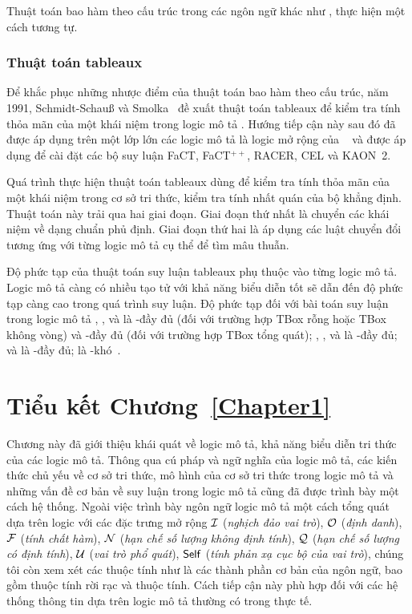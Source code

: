 Thuật toán bao hàm theo cấu trúc trong các ngôn ngữ khác như \FLbot, \ALN thực hiện một cách tương tự.

\subsubsection{Thuật toán tableaux}
\label{sec:Chap1.Tableaux}
Để khắc phục những nhược điểm của thuật toán bao hàm theo cấu trúc, năm 1991, Schmidt-Schau{\ss} và Smolka~\cite{Schmidt1991} đề xuất thuật toán tableaux để kiểm tra tính thỏa mãn của một khái niệm trong logic mô tả \ALC. Hướng tiếp cận này sau đó đã được áp dụng trên một lớp lớn các logic mô tả là logic mở rộng của \ALC~\cite{DLHandbook2007,Baader2001, Hollunder1990,Hollunder1991,Nguyen2011,Nguyen2011B,Nguyen2011C,Nguyen2013B} và được áp dụng để cài đặt các bộ suy luận FaCT, FaCT$^{++}$, RACER, CEL và KAON~2.

Quá trình thực hiện thuật toán tableaux dùng để kiểm tra tính thỏa mãn của một khái niệm trong cơ sở tri thức, kiểm tra tính nhất quán của bộ khẳng định. Thuật toán này trải qua hai giai đoạn. Giai đoạn thứ nhất là chuyển các khái niệm về dạng chuẩn phủ định. Giai đoạn thứ hai là áp dụng các luật chuyển đổi tương ứng với từng logic mô tả cụ thể để tìm mâu thuẫn.

Độ phức tạp của thuật toán suy luận tableaux phụ thuộc vào từng logic mô tả. Logic mô tả càng có nhiều tạo tử với khả năng biểu diễn tốt sẽ dẫn đến độ phức tạp càng cao trong quá trình suy luận. Độ phức tạp đối với bài toán suy luận trong logic mô tả \ALC, \ALCI, \ALCIQ và \LogicS là \PSPACE-đầy đủ (đối với trường hợp TBox rỗng hoặc TBox không vòng) và \EXPTIME-đầy đủ (đối với trường hợp TBox tổng quát); \SH, \SHI, \SHIN và \SHIQ là \EXPTIME-đầy đủ; \SHOIN và \SHOIQ là \NEXPTIME-đầy đủ; \SROIQ là \NEXPTIME-khó~\cite{Horrocks1999,Horrocks2000, Horrocks2006,Horrocks2007B,Nguyen2009,Nguyen2013,Nguyen2013B,Zolin2014}.

\section*{Tiểu kết Chương~\ref{Chapter1}}
\label{sec:Chap1.Summary}

Chương này đã giới thiệu khái quát về logic mô tả, khả năng biểu diễn tri thức của các logic mô tả. Thông qua cú pháp và ngữ nghĩa của logic mô tả, các kiến thức chủ yếu về cơ sở tri thức, mô hình của cơ sở tri thức trong logic mô tả và những vấn đề cơ bản về suy luận trong logic mô tả cũng đã được trình bày một cách hệ thống. Ngoài việc trình bày ngôn ngữ logic mô tả một cách tổng quát dựa trên logic \ALCreg với các đặc trưng mở rộng $\mathcal{I}$ ({\em nghịch đảo vai trò}), $\mathcal{O}$ ({\em định danh}), $\mathcal{F}$ ({\em tính chất hàm}), $\mathcal{N}$ ({\em hạn chế số lượng không định tính}), $\mathcal{Q}$ ({\em hạn chế số lượng có định tính}), $\mathcal{U}$ ({\em vai trò phổ quát}), $\mathsf{Self}$ ({\em tính phản xạ cục bộ của vai trò}), chúng tôi còn xem xét các thuộc tính như là các thành phần cơ bản của ngôn ngữ, bao gồm thuộc tính rời rạc và thuộc tính. Cách tiếp cận này phù hợp đối với các hệ thống thông tin dựa trên logic mô tả thường có trong thực tế.
\cleardoublepage